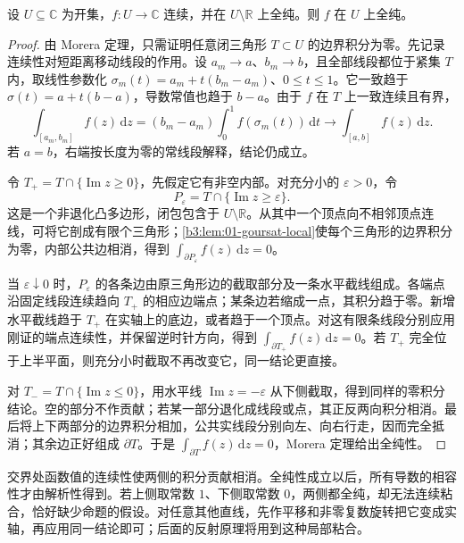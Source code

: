 \begin{proposition}[跨直线粘合]\label{b3:prop:02-line-gluing}
设 \(U\subseteq\mathbb C\) 为开集，\(f:U\to\mathbb C\) 连续，并在 \(U\setminus\mathbb R\) 上全纯。则 \(f\) 在 \(U\) 上全纯。
\end{proposition}
\begin{proof}
由 Morera 定理，只需证明任意闭三角形 \(T\subset U\) 的边界积分为零。先记录连续性对短距离移动线段的作用。设 \(a_m\to a\)、\(b_m\to b\)，且全部线段都位于紧集 \(T\) 内，取线性参数化
\(\sigma_m(t)=a_m+t(b_m-a_m)\)、\(0\le t\le1\)。它一致趋于 \(\sigma(t)=a+t(b-a)\)，导数常值也趋于 \(b-a\)。由于 \(f\) 在 \(T\) 上一致连续且有界，
\[
 \int_{[a_m,b_m]}f(z)\,\mathrm{d}z
 =(b_m-a_m)\int_0^1 f(\sigma_m(t))\,\mathrm{d}t
 \longrightarrow\int_{[a,b]}f(z)\,\mathrm{d}z.
\]
若 \(a=b\)，右端按长度为零的常线段解释，结论仍成立。

令 \(T_+=T\cap\{\operatorname{Im}z\ge0\}\)，先假定它有非空内部。对充分小的 \(\varepsilon>0\)，令
\[
 P_\varepsilon=T\cap\{\operatorname{Im}z\ge\varepsilon\}.
\]
这是一个非退化凸多边形，闭包包含于 \(U\setminus\mathbb R\)。从其中一个顶点向不相邻顶点连线，可将它剖成有限个三角形；\cref{b3:lem:01-goursat-local}使每个三角形的边界积分为零，内部公共边相消，得到 \(\int_{\partial P_\varepsilon}f(z)\,\mathrm{d}z=0\)。

当 \(\varepsilon\downarrow0\) 时，\(P_\varepsilon\) 的各条边由原三角形边的截取部分及一条水平截线组成。各端点沿固定线段连续趋向 \(T_+\) 的相应边端点；某条边若缩成一点，其积分趋于零。新增水平截线趋于 \(T_+\) 在实轴上的底边，或者趋于一个顶点。对这有限条线段分别应用刚证的端点连续性，并保留逆时针方向，得到
\(\int_{\partial T_+}f(z)\,\mathrm{d}z=0\)。若 \(T_+\) 完全位于上半平面，则充分小时截取不再改变它，同一结论更直接。

对 \(T_-=T\cap\{\operatorname{Im}z\le0\}\)，用水平线 \(\operatorname{Im}z=-\varepsilon\) 从下侧截取，得到同样的零积分结论。空的部分不作贡献；若某一部分退化成线段或点，其正反两向积分相消。最后将上下两部分的边界积分相加，公共实线段分别向左、向右行走，因而完全抵消；其余边正好组成 \(\partial T\)。于是 \(\int_{\partial T}f(z)\,\mathrm{d}z=0\)，Morera 定理给出全纯性。
\end{proof}

交界处函数值的连续性使两侧的积分贡献相消。全纯性成立以后，所有导数的相容性才由解析性得到。若上侧取常数 \(1\)、下侧取常数 \(0\)，两侧都全纯，却无法连续粘合，恰好缺少命题的假设。对任意其他直线，先作平移和非零复数旋转把它变成实轴，再应用同一结论即可；后面的反射原理将用到这种局部粘合。
